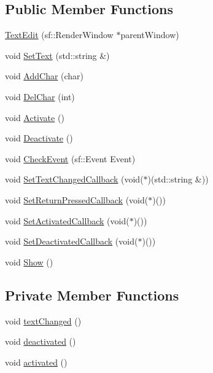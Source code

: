 \subsection*{Public Member Functions}
\begin{CompactItemize}
\item 
\hyperlink{classsfgui_1_1TextEdit_c6f2d938ccf876f05a9a9c47060c6093}{TextEdit} (sf::RenderWindow $\ast$parentWindow)
\item 
void \hyperlink{classsfgui_1_1TextEdit_16ffefa7f0c0d6e01275b8a2afa5975e}{SetText} (std::string \&)
\item 
void \hyperlink{classsfgui_1_1TextEdit_203952f38ce3bd68695597fee4b4397b}{AddChar} (char)
\item 
void \hyperlink{classsfgui_1_1TextEdit_dc95dab7bac1c41d0cebff1268f80c22}{DelChar} (int)
\item 
void \hyperlink{classsfgui_1_1TextEdit_bcd256e053ae8f13a5c7f919f79c03c9}{Activate} ()
\item 
void \hyperlink{classsfgui_1_1TextEdit_49b0919fd6c43c35913f8a46a6788270}{Deactivate} ()
\item 
void \hyperlink{classsfgui_1_1TextEdit_af6d4be3633d3eb8bcc7a1007e324da8}{CheckEvent} (sf::Event Event)
\item 
void \hyperlink{classsfgui_1_1TextEdit_2c80f417ea995a6452fcb47740701e1e}{SetTextChangedCallback} (void($\ast$)(std::string \&))
\item 
void \hyperlink{classsfgui_1_1TextEdit_b60f88cc667196bb073091e8878483f4}{SetReturnPressedCallback} (void($\ast$)())
\item 
void \hyperlink{classsfgui_1_1TextEdit_68bda298b3563eb960e77c3712664db8}{SetActivatedCallback} (void($\ast$)())
\item 
void \hyperlink{classsfgui_1_1TextEdit_6d75bcac8949d08513caa72e898e9b43}{SetDeactivatedCallback} (void($\ast$)())
\item 
void \hyperlink{classsfgui_1_1TextEdit_1ee03247816213b34caaff365b160de0}{Show} ()
\end{CompactItemize}
\subsection*{Private Member Functions}
\begin{CompactItemize}
\item 
void \hyperlink{classsfgui_1_1TextEdit_04bf790d96e0014479cc791691ecbade}{textChanged} ()
\item 
void \hyperlink{classsfgui_1_1TextEdit_c5ff761e3933294b46892db32e62b9f6}{deactivated} ()
\item 
void \hyperlink{classsfgui_1_1TextEdit_c009c601675801f2039d8f526e6fc921}{activated} ()
\end{CompactItemize}
